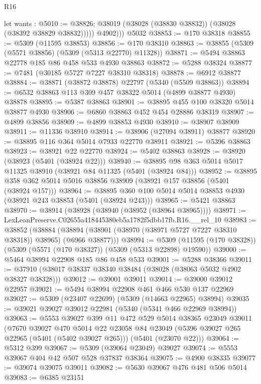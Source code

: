 \begin{lexlean}{R16}
\begin{coremodule}
            let wants : @5010 := @38826;
            @38019 (@38028 (@38830 @38832)) (@38028 (@38392 @38829 @38832)))))
          @4902)))
    @5032
@38853 := @170 @38318
@38855 := @5309 (@11595 @38853)
@38856 := @170 @38310
@38863 := @38855 (@5309 (@5571 @38856) (@5309 (@5313 @22770) @11328))
@38871 := @5494 @38863 @22778 @185 @86 @458 @533 @4930 @38863
@38872 := @5288 @38324
@38877 := @7481 (@30185 @5727 @7227 @38310 @38318)
@38878 := @6912 @38877
@38884 := @38871 (@38872 @38878) @22797 (@5340 (@5509 @38863))
@38894 := @6532 @38863 @113 @309 @457 @38322 @5014 (@4899 @38877 @4930) @38878
@38895 := @5387 @38863
@38901 := @38895 @455 @100 @38320 @5014 @38877 @4930
@38906 := @6860 @38863 @452 @454 @28886 @38319
@38907 := @4899 @38856
@38909 := @4899 @38853 @4930
@38910 := @38907 @38909
@38911 := @11336 @38910
@38914 := @38906 (@27094 @38911) @38877
@38920 := @38895 @116 @364 @5014 @7933 @22770 @38911
@38921 := @5396 @38863
@38923 := @38921 @22 @22770
@38924 := @5402 @38863
@38928 := @38920 (@38923 (@5401 (@38924 @22)))
@38940 := @38895 @98 @363 @5014 @5017 @11325 @38910 (@38921 @84 @11325 (@5401 (@38924 @84)))
@38952 := @38895 @358 @362 @5014 @5016 @38856 @38909 (@38921 @157 @38856 (@5401 (@38924 @157)))
@38964 := @38895 @360 @100 @5014 @5014 @38853 @4930 (@38921 @243 @38853 (@5401 (@38924 @243)))
@38965 := @5421 @38863
@38970 := @38914 (@38928 (@38940 (@38952 (@38964 @38965))))
@38971 := LexLeanPreserve.C02655a418445380eb5a1782f5dbb17fb.R16.__rel_10
@38983 := @38852
    (@38884 (@38894 (@38901 (@38970 (@38971 @5727 @7227 @38310 @38318)) @38965) (@6966 @38877)))
@38994 := @5309 (@11595 (@170 @38328)) (@5309 (@5571 (@170 @38327)) (@5309 (@5313 @22898) @19590))
@39000 := @5464 @38994 @22908 @185 @86 @458 @533
@39001 := @5288 @38366
@39011 := @37910 (@38017 @38337 @38340 @38484 (@38028 (@38063 @5032 @4902 @38327 @38328)))
@39012 := @39001 @39011
@39014 := @39000 @39012 @22957
@39021 := @5494 @38994 @22908 @461 @466 @530 @137 @22969
@39027 := @5309 (@23407 @22699) (@5309 (@14663 @22965) @38994)
@39035 := @39021 @39027 @39012 @22981 (@5340 (@5341 @466 @22969 @38994))
@39063 := @5553
    @39027
    @399
    @11
    @472
    @529
    @5014
    @38365
    @23049
    @39011
    (@7670
      @39027
      @470
      @5014
      @22
      @23058
      @84
      @23049
      (@5396 @39027 @265 @22965 (@5401 (@5402 @39027 @265)))
      (@5401 (@23070 @22)))
@39064 := @5312 @399
@39067 := @5309 (@39064 @23049) @39027
@39074 := @5553 @39067 @404 @42 @507 @528 @37837 @38364
@39075 := @4900 @38335
@39077 := @39074 @39075 @39011
@39082 := @5630 @39067 @476 @481 @506 @5014
@39083 := @6385 @23151

\end{coremodule}
\end{lexlean}
